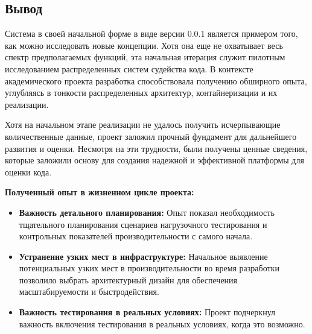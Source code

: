 \subsection{Вывод}
Система в своей начальной форме в виде версии 0.0.1 является примером того, как можно исследовать новые концепции. 
Хотя она еще не охватывает весь спектр предполагаемых функций, эта начальная итерация служит пилотным исследованием распределенных систем судейства кода.
В контексте академического проекта разработка способствовала получению обширного опыта, углубляясь в тонкости распределенных архитектур, контайнеризации и их реализации. \newline

\noindent
Хотя на начальном этапе реализации не удалось получить исчерпывающие количественные данные, проект заложил прочный фундамент для дальнейшего развития и оценки.
Несмотря на эти трудности, были получены ценные сведения, которые заложили основу для создания надежной и эффективной платформы для оценки кода.

\noindent
\textbf{Полученный опыт в жизненном цикле проекта:}
\begin{itemize}
    \item \textbf{Важность детального планирования:} Опыт показал необходимость тщательного планирования сценариев нагрузочного тестирования и контрольных показателей производительности с самого начала.
    \item \textbf{Устранение узких мест в инфраструктуре:} Начальное выявление потенциальных узких мест в производительности во время разработки позволило выбрать архитектурный дизайн для обеспечения масштабируемости и быстродействия.
    \item \textbf{Важность тестирования в реальных условиях:} Проект подчеркнул важность включения тестирования в реальных условиях, когда это возможно.
\end{itemize}